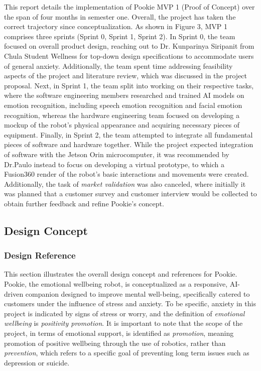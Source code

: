 This report details the implementation of Pookie MVP 1 (Proof of Concept) over the span of four months in semester one. Overall, the project has taken the correct trajectory since conceptualization. As shown in Figure 3, MVP 1 comprises three sprints (Sprint 0, Sprint 1, Sprint 2). In Sprint 0, the team focused on overall product design, reaching out to Dr. Kunparinya Siripanit from Chula Student Wellness for top-down design specifications to accommodate users of general anxiety. Additionally, the team spent time addressing feasibility aspects of the project and literature review, which was discussed in the project proposal. Next, in Sprint 1, the team split into working on their respective tasks, where the software engineering members researched and trained AI models on emotion recognition, including speech emotion recognition and facial emotion recognition, whereas the hardware engineering team focused on developing a mockup of the robot’s physical appearance and acquiring necessary pieces of equipment. Finally, in Sprint 2, the team attempted to integrate all fundamental pieces of software and hardware together. While the project expected integration of software with the Jetson Orin microcomputer, it was recommended by Dr.Paulo instead to focus on developing a virtual prototype, to which a Fusion360 render of the robot’s basic interactions and movements were created. Additionally, the task of \textit{market validation} was also canceled, where initially it was planned that a customer survey and customer interview would be collected to obtain further feedback and refine Pookie’s concept.

\newpage
\subsection{Design Concept}

\subsubsection{Design Reference}

This section illustrates the overall design concept and references for Pookie. Pookie, the emotional wellbeing robot, is conceptualized as a responsive, AI-driven companion designed
to improve mental well-being, specifically catered to customers under the influence of stress and anxiety. To be specific, anxiety in this project is indicated by signs of stress or worry, and the definition of \textit{emotional wellbeing} is \textit{positivity promotion}. It is important to note that the scope of the project, in terms of emotional support, is identified as \textit{promotion}, meaning promotion of positive wellbeing through the use of robotics, rather than \textit{prevention}, which refers to a specific goal of preventing long term issues such as depression or suicide.

